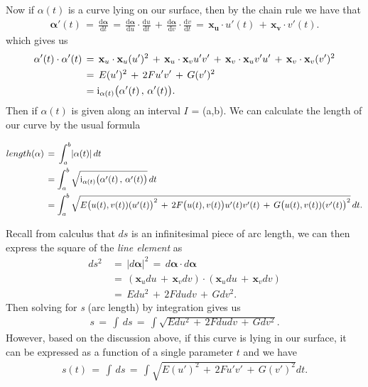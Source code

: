 \documentclass{UKZNcomp}
\newcommand{\vect}[1]{\mathbf{#1}} %
\newcommand{\RN}[1]{%
  \textup{\uppercase\expandafter{\romannumeral#1}}%
}
\newcommand\deriv[2]{\frac{\mathrm d #1}{\mathrm d #2}}
\theoremstyle{definition}
\theoremstyle{remark}
\begin{document}
Now if $\alpha(t)$ is a curve lying on our surface, then by the chain rule we have that
\begin{align*}
\vect{\alpha}'(t) \, = \, \deriv{\vect{\alpha}}{t} \, = \, \deriv{\vect{\alpha}}{u} \cdot \deriv{u}{t} \, + \, \deriv{\vect{\alpha}}{v} \cdot \deriv{v}{t} \, = \, \vect{x_{\bm{u}}}\cdot u'(t) \, + \, \vect{x_{\bm{v}}}\cdot v'(t).
\end{align*}
which gives us 
\begin{align*}
\vect{\alpha}'(t) \cdot \vect{\alpha}'(t) \, &= \, \vect x_u\cdot\vect x_u(u')^2 \,+ \,\vect x_u\cdot\vect x_vu'v' \,+\, \vect x_v\cdot\vect x_uv'u' \, + \,\vect x_v\cdot\vect x_v(v')^2\\
&= \,E(u')^2 \, + \, 2Fu'v' \, + \, G(v')^2\\
&= \RN{1}_{\vect{\alpha}(t)}\big(\vect{\alpha}'(t)\, , \, \vect{\alpha}'(t)\big).
\end{align*}
Then if $\alpha(t)$ is given along an interval $I$ = (a,b). We can calculate the length of our curve by the usual formula


\begin{align*}
length(\vect{\alpha}) \, &= \, \int_a^b \lvert \vect{\alpha}(t)\rvert  \, dt\\
&= \int_a^b \sqrt{\RN{1}_{\vect{\alpha}(t)}\big(\vect{\alpha}'(t)\, , \, \vect{\alpha}'(t)\big)}  \, dt\\
&= \int_a^b \sqrt{E\big(u(t),v(t))(u'(t)\big)^2 \, + \, 2F\big(u(t),v(t)\big)u'(t)v'(t) \, + \, G\big(u(t),v(t))(v'(t)\big)^2} \, dt.\\
\end{align*}


Recall from calculus that $ds$ is an infinitesimal piece of arc length, we can then express the square of the \textit{line element} as
\begin{align*}
ds^2 \, &= \, \lvert d \vect{\alpha} \rvert^2 \, = \, d \vect{\alpha}\cdot d \vect{\alpha} \\
&=\,  (\vect x_udu \, + \, \vect x_vdv) \cdot (\vect x_udu \, + \, \vect x_vdv)\\
&= \, Edu^2 \, + \, 2Fdudv \, + \, Gdv^2.
\end{align*} 
Then solving for \textit{s} (arc length) by integration gives us
\begin{align*}
s \, = \, \int \, ds \, = \, \int \sqrt{Edu^2 \, + \, 2Fdudv \, + \, Gdv^2}.
\end{align*}
However, based on the discussion above, if this curve is lying in our surface, it can be expressed as a function of a single parameter $t$ and we have 
\begin{align*}
s(t) \, = \, \int \, ds \, = \, \int \sqrt{E(u')^2 \, + \, 2Fu'v' \, + \, G(v')^2}dt.
\end{align*}
\end{document}
